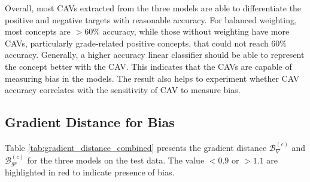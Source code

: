 Overall, most CAVs extracted from the three models are able to differentiate the positive and negative targets with reasonable accuracy. For balanced weighting, most concepts are $> 60\%$ accuracy, while those without weighting have more CAVs, particularly grade-related positive concepts, that could not reach $60\%$ accuracy. Generally, a higher accuracy linear classifier should be able to represent the concept better with the CAV. This indicates that the CAVs are capable of measuring bias in the models. The result also helps to experiment whether CAV accuracy correlates with the sensitivity of CAV to measure bias.

\subsection{Gradient Distance for Bias} \label{sec:gradient_distance}

Table \ref{tab:gradient_distance_combined} presents the gradient distance $\mathcal{B}^{(c)}_{\nabla}$ and $\mathcal{B}^{(c)}_{gr}$ for the three models on the test data. The value $< 0.9$ or $> 1.1$ are highlighted in red to indicate presence of bias.


